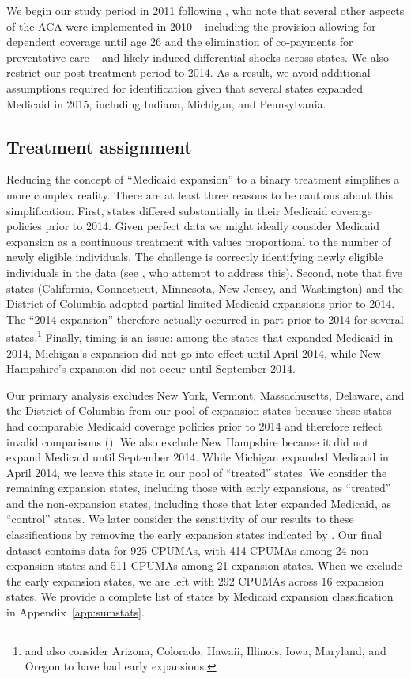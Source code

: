 \documentclass[aoas]{imsart}
\theoremstyle{plain}
\theoremstyle{remark}
\begin{document}
We begin our study period in 2011 following \cite{courtemanche2017early}, who note that several other aspects of the ACA were implemented in 2010 -- including the provision allowing for dependent coverage until age 26 and the elimination of co-payments for preventative care -- and likely induced differential shocks across states. We also restrict our post-treatment period to 2014. As a result, we avoid additional assumptions required for identification given that several states expanded Medicaid in 2015, including Indiana, Michigan, and Pennsylvania.

\subsection{Treatment assignment} \label{sssec:txassign}

Reducing the concept of ``Medicaid expansion'' to a binary treatment simplifies a more complex reality. There are at least three reasons to be cautious about this simplification. First, states differed substantially in their Medicaid coverage policies prior to 2014. Given perfect data we might ideally consider Medicaid expansion as a continuous treatment with values proportional to the number of newly eligible individuals. The challenge is correctly identifying newly eligible individuals in the data (see \cite{frean2017premium}, who attempt to address this). Second, \cite{frean2017premium} note that five states (California, Connecticut, Minnesota, New Jersey, and Washington) and the District of Columbia adopted partial limited Medicaid expansions prior to 2014. The ``2014 expansion'' therefore actually occurred in part prior to 2014 for several states.\footnote{\cite{kaestner2017effects} and \cite{courtemanche2017early} also consider Arizona, Colorado, Hawaii, Illinois, Iowa, Maryland, and Oregon to have had early expansions.} Finally, timing is an issue: among the states that expanded Medicaid in 2014, Michigan's expansion did not go into effect until April 2014, while New Hampshire's expansion did not occur until September 2014.

Our primary analysis excludes New York, Vermont, Massachusetts, Delaware, and the District of Columbia from our pool of expansion states because these states had comparable Medicaid coverage policies prior to 2014 and therefore reflect invalid comparisons (\cite{kaestner2017effects}). We also exclude New Hampshire because it did not expand Medicaid until September 2014. While Michigan expanded Medicaid in April 2014, we leave this state in our pool of ``treated'' states. We consider the remaining expansion states, including those with early expansions, as ``treated'' and the non-expansion states, including those that later expanded Medicaid, as ``control'' states. We later consider the sensitivity of our results to these classifications by removing the early expansion states indicated by \cite{frean2017premium}. Our final dataset contains data for 925 CPUMAs, with 414 CPUMAs among 24 non-expansion states and 511 CPUMAs among 21 expansion states. When we exclude the early expansion states, we are left with 292 CPUMAs across 16 expansion states. We provide a complete list of states by Medicaid expansion classification in Appendix~\ref{app:sumstats}.
\end{document}
